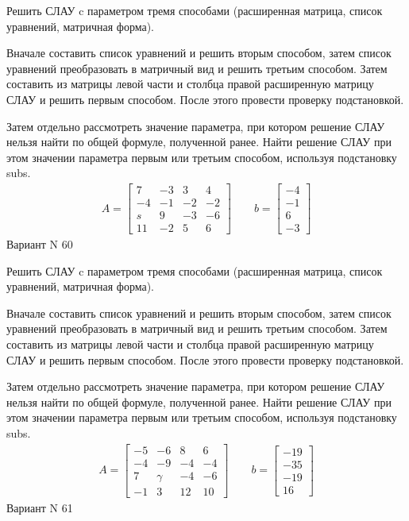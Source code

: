 \documentclass[11pt]{report}
\begin{document}
Решить СЛАУ c параметром тремя способами (расширенная матрица, список уравнений, матричная форма).

Вначале составить список уравнений и решить вторым способом,
затем список уравнений преобразовать в матричный вид и решить третьим способом.
Затем составить из матрицы левой части и столбца правой расширенную матрицу СЛАУ и решить первым способом.
После этого провести проверку подстановкой.

Затем отдельно рассмотреть значение параметра, при котором решение СЛАУ нельзя найти по общей формуле,
полученной ранее.
Найти решение СЛАУ при этом значении параметра первым или третьим способом, используя подстановку subs.
\begin{align*}
    A = \left[\begin{matrix}7 & -3 & 3 & 4\\-4 & -1 & -2 & -2\\s & 9 & -3 & -6\\11 & -2 & 5 & 6\end{matrix}\right]
\qquad b = \left[\begin{matrix}-4\\-1\\6\\-3\end{matrix}\right]
\end{align*}
\newpage
Вариант N 60


Решить СЛАУ c параметром тремя способами (расширенная матрица, список уравнений, матричная форма).

Вначале составить список уравнений и решить вторым способом,
затем список уравнений преобразовать в матричный вид и решить третьим способом.
Затем составить из матрицы левой части и столбца правой расширенную матрицу СЛАУ и решить первым способом.
После этого провести проверку подстановкой.

Затем отдельно рассмотреть значение параметра, при котором решение СЛАУ нельзя найти по общей формуле,
полученной ранее.
Найти решение СЛАУ при этом значении параметра первым или третьим способом, используя подстановку subs.
\begin{align*}
    A = \left[\begin{matrix}-5 & -6 & 8 & 6\\-4 & -9 & -4 & -4\\7 & \gamma & -4 & -6\\-1 & 3 & 12 & 10\end{matrix}\right]
\qquad b = \left[\begin{matrix}-19\\-35\\-19\\16\end{matrix}\right]
\end{align*}
\newpage
Вариант N 61
\end{document}
